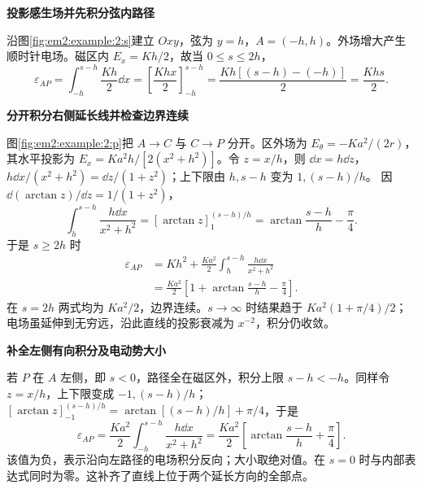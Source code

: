 \begin{solution}\textbf{投影感生场并先积分弦内路径}\par\nobreak
沿图\ref{fig:em2:example:2:s}建立 $Oxy$，弦为 $y=h$，$A=(-h,h)$。外场增大产生顺时针电场。磁区内 $E_x=Kh/2$，故当 $0\le s\le2h$，
\[\varepsilon_{AP}=\int_{-h}^{s-h}\frac{Kh}{2}\dd x=\left[\frac{Khx}{2}\right]_{-h}^{s-h}=\frac{Kh[(s-h)-(-h)]}{2}=\frac{Khs}{2}.\]



\par\medskip{}\noindent\textbf{分开积分右侧延长线并检查边界连续}\par\nobreak
图\ref{fig:em2:example:2:p}把 $A\to C$ 与 $C\to P$ 分开。区外场为 $E_\theta=-Ka^2/(2r)$，其水平投影为 $E_x=Ka^2h/[2(x^2+h^2)]$。令 $z=x/h$，则 $\dd x=h\dd z$，
$h\dd x/(x^2+h^2)=\dd z/(1+z^2)$；上下限由 $h,s-h$ 变为 $1,(s-h)/h$。
因 $\dd(\arctan z)/\dd z=1/(1+z^2)$，
\[
 \int_h^{s-h}\frac{h\dd x}{x^2+h^2}
 =[\arctan z]_1^{(s-h)/h}
 =\arctan\frac{s-h}{h}-\frac\pi4.
\]
于是 $s\ge2h$ 时
\begin{align*}\varepsilon_{AP}&=Kh^2+\frac{Ka^2}{2}\int_h^{s-h}\frac{h\dd x}{x^2+h^2}\\&=\frac{Ka^2}{2}\left[1+\arctan\frac{s-h}{h}-\frac\pi4\right].\end{align*}
在 $s=2h$ 两式均为 $Ka^2/2$，边界连续。$s\to\infty$ 时结果趋于 $Ka^2(1+\pi/4)/2$；电场虽延伸到无穷远，沿此直线的投影衰减为 $x^{-2}$，积分仍收敛。



\par\medskip{}\noindent\textbf{补全左侧有向积分及电动势大小}\par\nobreak
若 $P$ 在 $A$ 左侧，即 $s<0$，路径全在磁区外，积分上限 $s-h<-h$。同样令 $z=x/h$，上下限变成 $-1,(s-h)/h$；
$[\arctan z]_{-1}^{(s-h)/h}=\arctan[(s-h)/h]+\pi/4$，于是
\[\varepsilon_{AP}=\frac{Ka^2}{2}\int_{-h}^{s-h}\frac{h\dd x}{x^2+h^2}=\frac{Ka^2}{2}\left[\arctan\frac{s-h}{h}+\frac\pi4\right].\]
该值为负，表示沿向左路径的电场积分反向；大小取绝对值。在 $s=0$ 时与内部表达式同时为零。这补齐了直线上位于两个延长方向的全部点。\end{solution}

